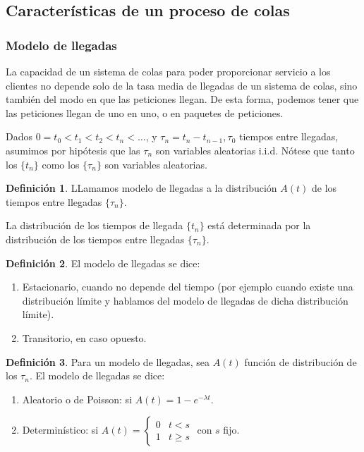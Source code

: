 \documentclass[a4paper,10pt]{scrartcl}
\theoremstyle{definition}
\newtheorem*{mydef}{Definición}
\numberwithin{equation}{section}
\begin{document}
\subsection{Características de un proceso de colas}
\subsubsection{Modelo de llegadas}
La capacidad de un sistema de colas para poder proporcionar servicio a los clientes no depende solo de la tasa media
de llegadas de un sistema de colas, sino también del modo en que las peticiones llegan. De esta forma, podemos
tener que las peticiones llegan de uno en uno, o en paquetes de peticiones.

Dados $0=t_0 < t_1 < t_2 < t_n < \ldots$, y $\tau_n = t_n - t_{n-1}, \tau_0$ tiempos entre llegadas, asumimos por hipótesis
que las $\tau_n$ son variables aleatorias i.i.d. Nótese que tanto los $\{t_n\}$ como los $\{\tau_n\}$ son
variables aleatorias.

\begin{mydef}
LLamamos modelo de llegadas a la distribución $A(t)$ de los tiempos entre llegadas $\{\tau_n\}$.
\end{mydef}
 
 La distribución de los tiempos de llegada $\{t_n\}$ está determinada por la distribución de los tiempos entre
 llegadas $\{\tau_n\}$. 
 
\begin{mydef}
El modelo de llegadas se dice:
 
 \begin{enumerate}
   \item Estacionario, cuando no depende del tiempo (por ejemplo cuando existe una distribución límite y hablamos
   del modelo de llegadas de dicha distribución límite).
   \item Transitorio, en caso opuesto.
 \end{enumerate}
\end{mydef}

 
\begin{mydef}
 Para un modelo de llegadas, sea $A(t)$ función de distribución de los $\tau_n$. 
 El modelo de llegadas se dice:

  \begin{enumerate}
  \item Aleatorio o de Poisson: si $A(t) = 1 - e^{-\lambda t}$.
  \item Determinístico: si $A(t) = \left\{\begin{array}{ll}
					0 & t<s \\
					1 & t\ge s
					\end{array}\right.$ con $s$ fijo.
  
  \end{enumerate}
\end{mydef}
\end{document}
